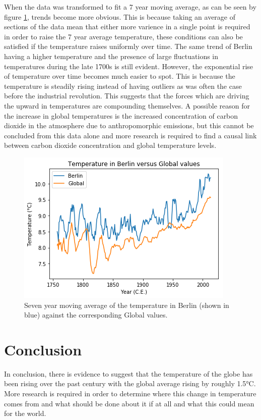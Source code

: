 \documentclass[journal, a4paper]{IEEEtran}
\begin{document}
    When the data was transformed to fit a 7 year moving average, as can be seen by figure \ref{fig2}, trends become more obvious. This is because taking an average of sections of the data mean that either more varience in a single point is required in order to raise the 7 year average temperature, these conditions can also be satisfied if the temperature raises uniformly over time. The same trend of Berlin having a higher temperature and the presence of large fluctuations in temperatures during the late 1700s is still evident. However, the exponential rise of temperature over time becomes much easier to spot. This is because the temperature is steadily rising instead of having outliers as was often the case before the industrial revolution. This suggests that the forces which are driving the upward in temperatures are compounding themselves. A possible reason for the increase in global temperatures is the increased concentration of carbon dioxide in the atmosphere due to anthropomorphic emissions, but this cannot be concluded from this data alone and more research is required to find a causal link between carbon dioxide concentration and global temperature levels.

	\begin{figure}[!hbt]
		\begin{center}
		\includegraphics[width=\columnwidth]{7DayMovingAverageTemperaturePlot.png}
		\caption{Seven year moving average of the temperature in Berlin (shown in blue) against the corresponding Global values.}
		\label{fig2}
		\end{center}
	\end{figure}

\newpage

\section{Conclusion}
	In conclusion, there is evidence to suggest that the temperature of the globe has been rising over the past century with the global average rising by roughly 1.5°C. More research is required in order to determine where this change in temperature comes from and what should be done about it if at all and what this could mean for the world.

\end{document}
